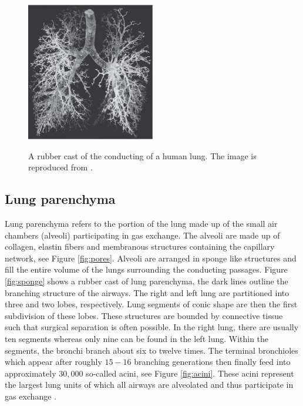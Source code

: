 %
\begin{figure}[H]
  \centering
{\label{fig:mouse}\includegraphics[width=0.5\textwidth]{figures/images/lung_west.pdf}}                
  \label{fig:acinar_units}
\caption{A rubber cast of the conducting of a human lung. The image is reproduced from \cite{west2008respiratory}.}
\label{fig:rubber_tree}
\end{figure}

\subsection{Lung parenchyma} 
 Lung parenchyma refers to the portion of the lung made up of the small air chambers (alveoli) participating in gas exchange. The alveoli are made up of collagen, elastin fibers and membranous structures containing the capillary network, see Figure \ref{fig:pores}. Alveoli are arranged in sponge like structures and fill the entire volume of the lungs surrounding the conducting passages. Figure \ref{fig:sponge} shows a rubber cast of lung parenchyma, the dark lines outline the branching structure of the airways.
The right and left lung are partitioned into three and two lobes, respectively. Lung segments of conic shape are then the first subdivision of these lobes. These structures are bounded by connective tissue such that surgical separation is often possible. In the right lung, there are usually ten segments whereas only nine can be found in the left lung. Within the segments, the bronchi branch about six to twelve times. The terminal bronchioles which appear after roughly $15-16$ branching generations then finally feed into approximately $30,000$ so-called acini, see Figure \ref{fig:acini}. These acini represent the largest lung units of which all airways are alveolated and thus participate in gas exchange \citep{WeichertThesis}.



